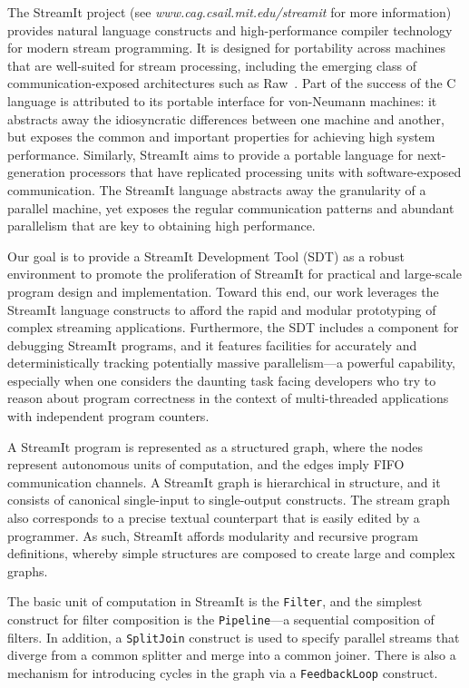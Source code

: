 \documentclass{csailabstractbook}
\begin{document}
The  StreamIt  project  (see {\it www.cag.csail.mit.edu/streamit}  for  more
information) provides natural language constructs and high-performance
compiler technology for modern  stream programming. It is designed for
portability   across  machines   that  are   well-suited   for  stream
processing,  including  the  emerging class  of  communication-exposed
architectures such  as Raw~\cite{raw}.  Part  of the success of  the C
language  is  attributed to  its  portable  interface for  von-Neumann
machines: it abstracts away  the idiosyncratic differences between one
machine and  another, but exposes the common  and important properties
for achieving  high system  performance.  Similarly, StreamIt  aims to
provide a  portable language for next-generation  processors that have
replicated processing units  with software-exposed communication.  The
StreamIt  language  abstracts  away  the  granularity  of  a  parallel
machine, yet  exposes the regular communication  patterns and abundant
parallelism that are key to obtaining high performance.

Our goal is  to provide a StreamIt Development Tool  (SDT) as a robust
environment to promote the proliferation of StreamIt for practical and
large-scale program  design and  implementation. Toward this  end, our
work leverages  the StreamIt language  constructs to afford  the rapid
and      modular       prototyping      of      complex      streaming
applications. Furthermore, the SDT  includes a component for debugging
StreamIt  programs,  and it  features  facilities  for accurately  and
deterministically   tracking   potentially   massive   parallelism---a
powerful capability,  especially when one considers  the daunting task
facing developers who  try to reason about program  correctness in the
context of multi-threaded applications with independent program counters.


A StreamIt  program is  represented as a  structured graph,  where the
nodes represent  autonomous units of computation, and  the edges imply
FIFO  communication channels.   A  StreamIt graph  is hierarchical  in
structure, and it consists  of canonical single-input to single-output
constructs.  The  stream graph also  corresponds to a  precise textual
counterpart that is easily edited  by a programmer.  As such, StreamIt
affords modularity  and recursive program  definitions, whereby simple
structures are composed to create large and complex graphs.

The basic unit of computation in StreamIt is the {\tt Filter}, and the
simplest construct  for filter  composition is the  {\tt Pipeline}---a
sequential  composition of  filters.  In  addition, a  {\tt SplitJoin}
construct  is used  to specify  parallel streams  that diverge  from a
common  splitter and  merge  into a  common  joiner. There  is also  a
mechanism for introducing cycles in the graph via a {\tt FeedbackLoop}
construct.
\end{document}
